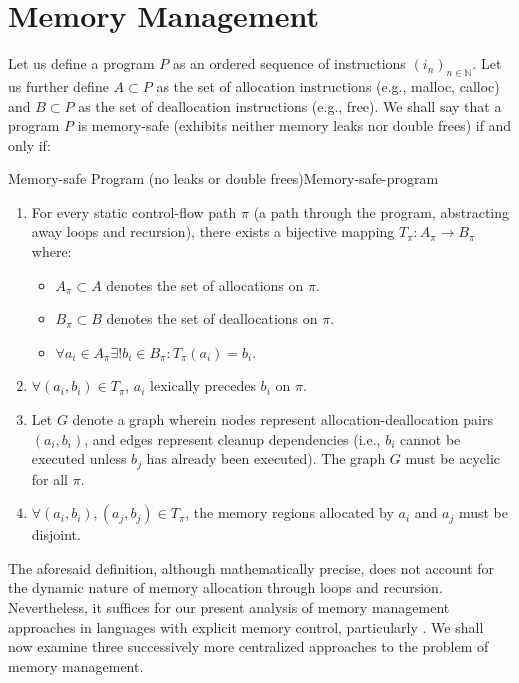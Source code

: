\section{Memory Management}
\label{sec:Managing-Memory}

Let us define a program $P$ as an ordered sequence of instructions $(i_n)_{n \in \mathbb{N}}$.
Let us further define $A \subset P$ as the set of allocation instructions (e.g., malloc, calloc) and
$B \subset P$ as the set of deallocation instructions (e.g., free).
We shall say that a program $P$ is memory-safe (exhibits neither memory leaks nor double frees) if and only if:

\begin{definition}{Memory-safe Program (no leaks or double frees)}{Memory-safe-program}
	\begin{enumerate}
		\item For every static control-flow path $\pi$ (a path through the program, abstracting away loops and recursion),
		      there exists a bijective mapping $T_{\pi} : A_{\pi} \rightarrow B_{\pi}$ where:
		      \begin{itemize}
			      \item $A_{\pi} \subset A$ denotes the set of allocations on $\pi$.
			      \item $B_{\pi} \subset B$ denotes the set of deallocations on $\pi$.
			      \item $\forall a_i \in A_{\pi} \exists ! b_i \in B_{\pi} : T_{\pi}(a_i) = b_i$.
		      \end{itemize}

		\item $\forall (a_i,b_i) \in T_{\pi}$, $a_i$ lexically precedes $b_i$ on $\pi$.
		\item Let $G$ denote a graph wherein nodes represent allocation-deallocation pairs $(a_i, b_i)$, and edges
		      represent cleanup dependencies (i.e., $b_i$ cannot be executed unless $b_j$ has already been executed).
		      The graph $G$ must be acyclic for all $\pi$.

		\item $\forall (a_i,b_i), (a_j,b_j) \in T_{\pi}$, the memory regions allocated by $a_i$ and $a_j$ must be
		      disjoint.
	\end{enumerate}
\end{definition}

The aforesaid definition, although mathematically precise, does not account for the dynamic nature of memory allocation through loops and recursion. Nevertheless, it suffices for our present analysis of memory management approaches in languages with explicit memory control, particularly \C{}. We shall now examine three successively more centralized approaches to the problem of memory management.

